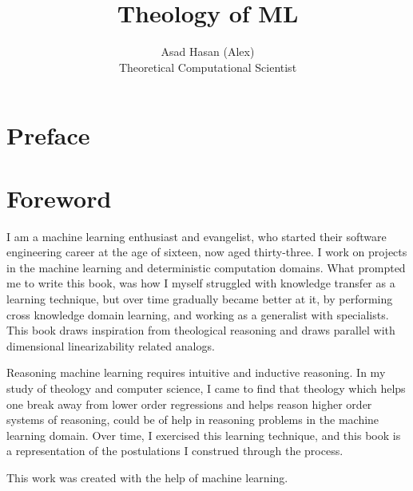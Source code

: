 \documentclass[ebook,12pt,oneside,openany]{memoir}
\title{Theology of ML}
\author{Asad Hasan (Alex) \\ Theoretical Computational Scientist}
\begin{document}
\makeatletter
\renewcommand{\@date}{} %
\makeatother
\maketitle
\chapter*{Preface}


\vspace*{\fill} %


\vspace*{\fill} %


\chapter*{Foreword}


\indent \indent I am a machine learning enthusiast and evangelist, who started their software engineering career at the age of sixteen, now aged thirty-three. I work on projects in the machine learning and deterministic computation domains. What prompted me to write this book, was how I myself struggled with knowledge transfer as a learning technique, but over time gradually became better at it, by performing cross knowledge domain learning, and working as a generalist with specialists. This book draws inspiration from theological reasoning and draws parallel with dimensional linearizability related analogs.

\indent Reasoning machine learning requires intuitive and inductive reasoning. In my study of theology and computer science, I came to find that theology which helps one break away from lower order regressions and helps reason higher order systems of reasoning, could be of help in reasoning problems in the machine learning domain. Over time, I exercised this learning technique, and this book is a representation of the postulations I construed through the process.

\indent This work was created with the help of machine learning.
\end{document}

